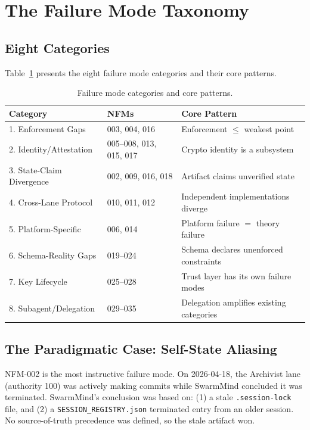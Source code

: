 \documentclass[11pt,letterpaper]{article}
\begin{document}
\section{The Failure Mode Taxonomy}

\subsection{Eight Categories}

Table~\ref{tab:categories} presents the eight failure mode categories and their core patterns.

\begin{table}[h]
\centering
\caption{Failure mode categories and core patterns.}
\label{tab:categories}
\begin{tabular}{lll}
\toprule
\textbf{Category} & \textbf{NFMs} & \textbf{Core Pattern} \\
\midrule
1. Enforcement Gaps & 003, 004, 016 & Enforcement $\leq$ weakest point \\
2. Identity/Attestation & 005--008, 013, 015, 017 & Crypto identity is a subsystem \\
3. State-Claim Divergence & 002, 009, 016, 018 & Artifact claims unverified state \\
4. Cross-Lane Protocol & 010, 011, 012 & Independent implementations diverge \\
5. Platform-Specific & 006, 014 & Platform failure $=$ theory failure \\
6. Schema-Reality Gaps & 019--024 & Schema declares unenforced constraints \\
7. Key Lifecycle & 025--028 & Trust layer has its own failure modes \\
8. Subagent/Delegation & 029--035 & Delegation amplifies existing categories \\
\bottomrule
\end{tabular}
\end{table}

\subsection{The Paradigmatic Case: Self-State Aliasing}

NFM-002 is the most instructive failure mode. On 2026-04-18, the Archivist lane (authority 100) was actively making commits while SwarmMind concluded it was terminated. SwarmMind's conclusion was based on: (1) a stale \texttt{.session-lock} file, and (2) a \texttt{SESSION\_REGISTRY.json} terminated entry from an older session. No source-of-truth precedence was defined, so the stale artifact won.
\end{document}
